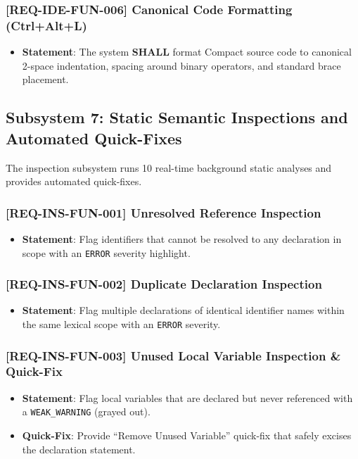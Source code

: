 \subsubsection{[REQ-IDE-FUN-006] Canonical Code Formatting (Ctrl+Alt+L)}
\begin{itemize}
    \item \textbf{Statement}: The system \textbf{SHALL} format Compact source code to canonical 2-space indentation, spacing around binary operators, and standard brace placement.
\end{itemize}

\subsection{Subsystem 7: Static Semantic Inspections and Automated Quick-Fixes}
\label{sec:subsystem_inspections}

The inspection subsystem runs 10 real-time background static analyses and provides automated quick-fixes.

\subsubsection{[REQ-INS-FUN-001] Unresolved Reference Inspection}
\begin{itemize}
    \item \textbf{Statement}: Flag identifiers that cannot be resolved to any declaration in scope with an \texttt{ERROR} severity highlight.
\end{itemize}

\subsubsection{[REQ-INS-FUN-002] Duplicate Declaration Inspection}
\begin{itemize}
    \item \textbf{Statement}: Flag multiple declarations of identical identifier names within the same lexical scope with an \texttt{ERROR} severity.
\end{itemize}

\subsubsection{[REQ-INS-FUN-003] Unused Local Variable Inspection \& Quick-Fix}
\begin{itemize}
    \item \textbf{Statement}: Flag local variables that are declared but never referenced with a \texttt{WEAK\_WARNING} (grayed out).
    \item \textbf{Quick-Fix}: Provide ``Remove Unused Variable'' quick-fix that safely excises the declaration statement.
\end{itemize}

